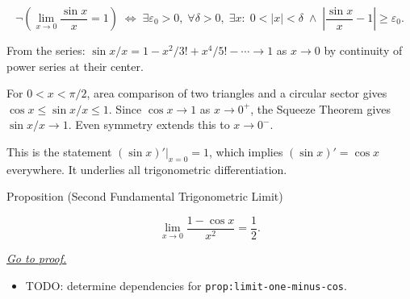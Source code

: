 \begin{remark*}
\[
  \neg\left(\lim_{x\to 0}\frac{\sin x}{x}=1\right)
  \;\iff\;
  \exists\varepsilon_0>0,\;\forall\delta>0,\;\exists x:\;
  0<|x|<\delta \;\wedge\;
  \left|\frac{\sin x}{x}-1\right|\geq\varepsilon_0.
\]
\end{remark*}

\begin{remark*}
From the series: $\sin x / x = 1 - x^2/3! + x^4/5! - \cdots \to 1$
as $x \to 0$ by continuity of power series at their center.
\end{remark*}

\begin{remark*}
For $0 < x < \pi/2$, area comparison of two triangles and a circular
sector gives $\cos x \leq \sin x / x \leq 1$. Since $\cos x \to 1$
as $x \to 0^+$, the Squeeze Theorem gives $\sin x / x \to 1$.
Even symmetry extends this to $x \to 0^-$.
\end{remark*}

\begin{remark*}[Significance]
This is the statement $(\sin x)'\big|_{x=0} = 1$, which implies
$(\sin x)' = \cos x$ everywhere. It underlies all trigonometric
differentiation.
\end{remark*}


\begin{propositionbox}{Proposition (Second Fundamental Trigonometric Limit)}
\begin{proposition}
\label{prop:limit-one-minus-cos}
\[
  \lim_{x \to 0} \frac{1 - \cos x}{x^2} = \frac{1}{2}.
\]

\smallskip\noindent
\hyperref[prf:limit-one-minus-cos]{\textit{Go to proof.}}
\end{proposition}
\end{propositionbox}

\begin{dependencies}
\begin{itemize}
  \item TODO: determine dependencies for \texttt{prop:limit-one-minus-cos}.
\end{itemize}
\end{dependencies}

